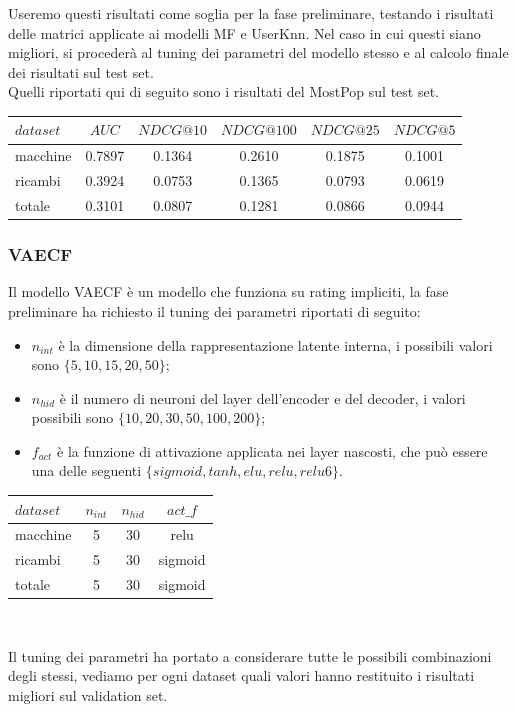 Useremo questi risultati come soglia per la fase preliminare, testando i risultati delle matrici applicate ai modelli MF e UserKnn. Nel caso in cui questi siano migliori, si procederà al tuning dei parametri del modello stesso e al calcolo finale dei risultati sul test set.\\
Quelli riportati qui di seguito sono i risultati del MostPop sul test set.\\

\begin{tabular}{|l|c|cccc|}
    \toprule
    $dataset$ &    $AUC$ &  $NDCG@10$ & $NDCG@100$  & $NDCG@25$ & $NDCG@5$  \\
    \midrule
    macchine & 0.7897 &  0.1364 &   0.2610 &  0.1875 & 0.1001 \\
    ricambi  & 0.3924 &  0.0753 &   0.1365 &  0.0793 & 0.0619 \\
    totale  & 0.3101 &  0.0807 &   0.1281 &  0.0866 & 0.0944 \\

\bottomrule
\end{tabular}

\subsubsection{VAECF}
Il modello VAECF è un modello che funziona su rating impliciti, la fase preliminare ha richiesto il tuning dei parametri riportati di seguito:
\begin{itemize}
    \item $n_{int}$ è la dimensione della rappresentazione latente interna, i possibili valori sono $\{5,10,15,20,50\}$;
    \item $n_{hid}$ è il numero di neuroni del layer dell'encoder e del decoder, i valori possibili sono $\{10,20,30,50,100,200\}$;
    \item $f_{act}$ è la funzione di attivazione applicata nei layer nascosti, che può essere una delle seguenti $\{sigmoid, tanh, elu, relu, relu6\}$.
\end{itemize}
\begin{minipage}[H]{0.45\textwidth}
    \begin{tabular}{|l|ccc|}
        \toprule
        $dataset$ &    $n_{int}$ &  $n_{hid}$ & $act\_f$ \\
        \midrule
        macchine & 5 & 30 & relu \\
        ricambi  &	5 & 30 & sigmoid\\
        totale  & 5 & 30 & sigmoid\\
    \bottomrule
    \end{tabular}\\
\end{minipage}
\begin{minipage}[H]{0.55\textwidth}
    Il tuning dei parametri ha portato a considerare tutte le possibili combinazioni degli stessi, vediamo per ogni dataset quali valori hanno restituito i risultati migliori sul validation set.
\end{minipage}\\

